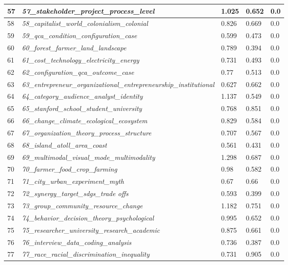 \documentclass[12pt]{article}
\begin{document}
\begin{longtable}{|l|l|l|l|l|}
57 & \textit{57\_stakeholder\_project\_process\_level} & 1.025 & 0.652 & 0.0 \\ \hline
58 & \textit{58\_capitalist\_world\_colonialism\_colonial} & 0.826 & 0.669 & 0.0 \\ \hline
59 & \textit{59\_qca\_condition\_configuration\_case} & 0.599 & 0.473 & 0.0 \\ \hline
60 & \textit{60\_forest\_farmer\_land\_landscape} & 0.789 & 0.394 & 0.0 \\ \hline
61 & \textit{61\_cost\_technology\_electricity\_energy} & 0.731 & 0.493 & 0.0 \\ \hline
62 & \textit{62\_configuration\_qca\_outcome\_case} & 0.77 & 0.513 & 0.0 \\ \hline
63 & \textit{63\_entrepreneur\_organizational\_entrepreneurship\_institutional} & 0.627 & 0.662 & 0.0 \\ \hline
64 & \textit{64\_category\_audience\_analyst\_identity} & 1.137 & 0.549 & 0.0 \\ \hline
65 & \textit{65\_stanford\_school\_student\_university} & 0.768 & 0.851 & 0.0 \\ \hline
66 & \textit{66\_change\_climate\_ecological\_ecosystem} & 0.829 & 0.584 & 0.0 \\ \hline
67 & \textit{67\_organization\_theory\_process\_structure} & 0.707 & 0.567 & 0.0 \\ \hline
68 & \textit{68\_island\_atoll\_area\_coast} & 0.561 & 0.431 & 0.0 \\ \hline
69 & \textit{69\_multimodal\_visual\_mode\_multimodality} & 1.298 & 0.687 & 0.0 \\ \hline
70 & \textit{70\_farmer\_food\_crop\_farming} & 0.98 & 0.582 & 0.0 \\ \hline
71 & \textit{71\_city\_urban\_experiment\_myth} & 0.67 & 0.66 & 0.0 \\ \hline
72 & \textit{72\_synergy\_target\_sdgs\_trade offs} & 0.593 & 0.399 & 0.0 \\ \hline
73 & \textit{73\_group\_community\_resource\_change} & 1.182 & 0.751 & 0.0 \\ \hline
74 & \textit{74\_behavior\_decision\_theory\_psychological} & 0.995 & 0.652 & 0.0 \\ \hline
75 & \textit{75\_researcher\_university\_research\_academic} & 0.875 & 0.661 & 0.0 \\ \hline
76 & \textit{76\_interview\_data\_coding\_analysis} & 0.736 & 0.387 & 0.0 \\ \hline
77 & \textit{77\_race\_racial\_discrimination\_inequality} & 0.731 & 0.905 & 0.0 \\ \hline

\end{longtable}
\end{document}

